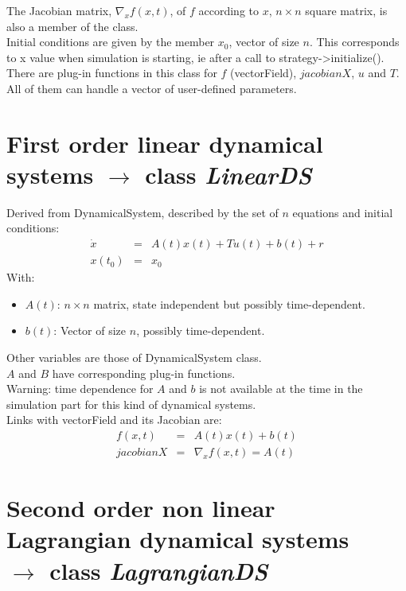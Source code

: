 \documentclass[10pt]{report}
\begin{document}
The Jacobian matrix, $\nabla_x f(x,t)$, of $f$ according to $x$, $n\times n$ square matrix, is also a member of the class. \\

Initial conditions are given by the member $x_0$, vector of size $n$. This corresponds to x value when
simulation is starting, ie after a call to strategy->initialize(). \\

There are plug-in functions in this class for $f$ (vectorField), $jacobianX$, $u$ and $T$. All
of them can handle a vector of user-defined parameters. 

\section{First order linear dynamical systems $\rightarrow$ class \it{LinearDS}}

Derived from DynamicalSystem, described by the set of $n$ equations and initial conditions: 
\begin{eqnarray}
  \dot x &=& A(t)x(t)+Tu(t)+b(t)+r \\
  x(t_0)&=&x_0 
\end{eqnarray}
With:
\begin{itemize}
\item $A(t)$: $n\times n$ matrix, state independent but possibly time-dependent.
\item $b(t)$: Vector of size $n$, possibly time-dependent.
\end{itemize}
Other variables are those of DynamicalSystem class. \\
$A$ and $B$ have corresponding plug-in functions. \\

Warning: time dependence for $A$ and $b$ is not available at the time in the simulation part for this kind of dynamical systems. \\

Links with vectorField and its Jacobian are: 
\begin{eqnarray}
  f(x,t) &=& A(t)x(t)+b(t) \\
  jacobianX&=&\nabla_x f(x,t) = A(t) 
\end{eqnarray}

\section{Second order non linear Lagrangian dynamical systems \\  $\rightarrow$ class \it{LagrangianDS}}
\end{document}
